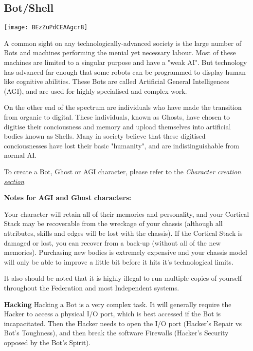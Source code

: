 \subsection{Bot/Shell}
\label{sec:specie-bots}

\texttt{[image: BEzZuPdCEAAgcr8]}

A common sight on any technologically-advanced society is the large number of Bots and machines performing the menial yet necessary labour. Most of these machines are limited to a singular purpose and have a "weak AI". But technology has advanced far enough that some robots can be programmed to display human-like cognitive abilities. These Bots are called Artificial General Intelligences (AGI), and are used for highly specialised and complex work.

On the other end of the spectrum are individuals who have made the transition from organic to digital. These individuals, known as Ghosts, have chosen to digitise their conciousness and memory and upload themselves into artificial bodies known as Shells. Many in society believe that these digitised conciousnesses have lost their basic "humanity", and are indistinguishable from normal AI.

To create a Bot, Ghost or AGI character, please refer to the \textit{\hyperref[sec:rules-creation]{Character creation section}}

\textbf{Notes for AGI and Ghost characters:}

Your character will retain all of their memories and personality, and your Cortical Stack may be recoverable from the wreckage of your chassis (although all attributes, skills and edges will be lost with the chassis). If the Cortical Stack is damaged or lost, you can recover from a back-up (without all of the new memories). Purchasing new bodies is extremely expensive and your chassis model will only be able to improve a little bit before it hits it's technological limits.

It also should be noted that it is highly illegal to run multiple copies of yourself throughout the Federation and most Independent systems.

\begin{paperbox}{\textbf{Hacking}} 
Hacking a Bot is a very complex task. It will generally require the Hacker to access a physical I/O port, which is best accessed if the Bot is incapacitated. Then the Hacker needs to open the I/O port (Hacker's Repair vs Bot's Toughness), and then break the software Firewalls (Hacker's Security opposed by the Bot's Spirit).
\end{paperbox}

